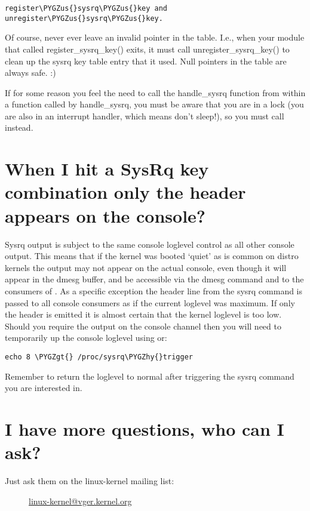 \documentclass[a4paper,8pt,english]{sphinxmanual}
\def\PYGZus{\char`\_}
\def\PYGZgt{\char`\>}
\def\PYGZhy{\char`\-}
\begin{document}
\begin{Verbatim}[commandchars=\\\{\}]
register\PYGZus{}sysrq\PYGZus{}key and unregister\PYGZus{}sysrq\PYGZus{}key.
\end{Verbatim}

Of course, never ever leave an invalid pointer in the table. I.e., when
your module that called register\_sysrq\_key() exits, it must call
unregister\_sysrq\_key() to clean up the sysrq key table entry that it used.
Null pointers in the table are always safe. :)

If for some reason you feel the need to call the handle\_sysrq function from
within a function called by handle\_sysrq, you must be aware that you are in
a lock (you are also in an interrupt handler, which means don't sleep!), so
you must call  instead.


\section{When I hit a SysRq key combination only the header appears on the console?}
\label{admin-guide/sysrq:when-i-hit-a-sysrq-key-combination-only-the-header-appears-on-the-console}
Sysrq output is subject to the same console loglevel control as all
other console output.  This means that if the kernel was booted `quiet'
as is common on distro kernels the output may not appear on the actual
console, even though it will appear in the dmesg buffer, and be accessible
via the dmesg command and to the consumers of .  As a specific
exception the header line from the sysrq command is passed to all console
consumers as if the current loglevel was maximum.  If only the header
is emitted it is almost certain that the kernel loglevel is too low.
Should you require the output on the console channel then you will need
to temporarily up the console loglevel using  or:

\begin{Verbatim}[commandchars=\\\{\}]
echo 8 \PYGZgt{} /proc/sysrq\PYGZhy{}trigger
\end{Verbatim}

Remember to return the loglevel to normal after triggering the sysrq
command you are interested in.


\section{I have more questions, who can I ask?}
\label{admin-guide/sysrq:i-have-more-questions-who-can-i-ask}\begin{description}
\item[{Just ask them on the linux-kernel mailing list:}] \leavevmode
\href{mailto:linux-kernel@vger.kernel.org}{linux-kernel@vger.kernel.org}

\end{description}
\end{document}
